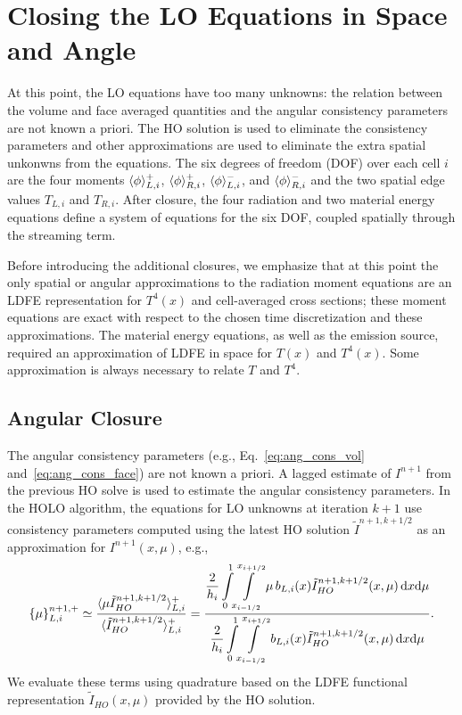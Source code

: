 \section{Closing the LO Equations in Space and Angle}
\label{sec:closure}

At this point, the LO equations have too many unknowns: the relation between the volume
and face averaged quantities and the angular consistency parameters are not known a
priori. The HO solution is used to eliminate the consistency parameters and other
approximations are used to eliminate the extra spatial unkonwns from the equations.
The six degrees of freedom (DOF) over each cell $i$ are the four moments $\langle \phi \rangle_{L,i}^+$,
$\langle \phi \rangle_{R,i}^+$, $\langle \phi \rangle_{L,i}^-$, and $\langle \phi \rangle_{R,i}^-$ and the two
spatial edge values $T_{L,i}$ and $T_{R,i}$.  After closure, the four radiation and two material
energy equations define a system of equations for the six DOF, coupled spatially through
the streaming term.  

Before introducing the additional closures, we emphasize that at this point the only spatial or
angular approximations to the radiation  moment equations are an LDFE
representation for $T^4(x)$ and cell-averaged cross sections; these moment equations are exact with
respect to the chosen time discretization and these approximations.  The material energy
equations, as well as the emission source, required an approximation of LDFE in space for $T(x)$ and $T^4(x)$.  Some
approximation is always necessary
to relate $T$ and $T^4$.

\subsection{Angular Closure}

The angular consistency
parameters (e.g., Eq.~\eqref{eq:ang_cons_vol} and~\eqref{eq:ang_cons_face}) are not known a priori. 
A lagged estimate of $I^{n+1}$ from the previous HO solve is
used to estimate the angular consistency parameters. In the HOLO algorithm, the equations for LO unknowns at iteration $k+1$ use consistency parameters
computed using the latest HO solution $\tilde{I}^{n+1,k+1/2}$
as an approximation for $I^{n+1}(x,\mu)$, e.g.,
\begin{equation}\label{eq:ang_cons_vol}
    \left\{ {\mu} \right\}_{L,i}^{n+1,+} \simeq \frac{\langle \mu
    \tilde I_{HO}^{n+1,k+1/2} \rangle_{L,i}^+}{\displaystyle \langle \tilde I_{HO}^{n+1,k+1/2} \rangle_{L,i}^+} =
    \frac{\displaystyle 
{\displaystyle \frac{2}{h_i}} \int\limits_0^1 \!\int\limits_{x_{i-1/2}}^{x_{i+1/2}} \mu \, b_{L,i}(x)
\tilde I^{n+1,k+1/2}_{HO}(x,\mu)\, \mathrm{d} x \mathrm{d} \mu } 
{\displaystyle {\displaystyle \frac{2}{h_i}} \int\limits_0^1 \!\int\limits_{x_{i-1/2}}^{x_{i+1/2}}  b_{L,i}(x)
\tilde I^{n+1,k+1/2}_{HO}(x,\mu)\, \mathrm{d} x \mathrm{d} \mu } .
\end{equation}
We evaluate these terms using quadrature based
on the LDFE functional representation $\tilde I_{HO}(x,\mu)$ provided by the HO solution.

